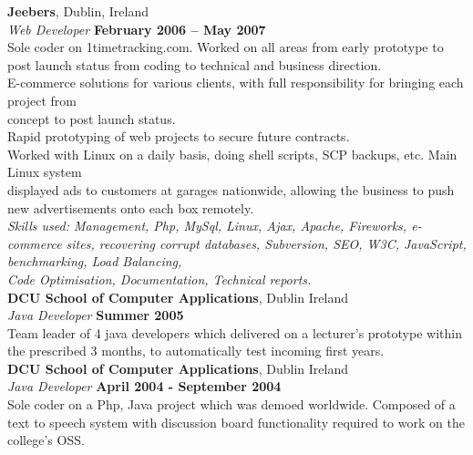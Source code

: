 \documentclass[margin,line]{resume}
\begin{document}
\begin{resume}
    \textbf{Jeebers}, Dublin, Ireland \vspace{2mm}\\\vspace{1mm}%
    \textsl{Web Developer} \hfill \textbf{February 2006 -- May 2007}\\
    Sole coder on 1timetracking.com. Worked on all areas from early prototype to post launch status from coding to technical and business direction. \\%
    E-commerce solutions for various clients, with full responsibility for bringing each project from \\ concept to post launch status. \vspace{1mm}\\%
    Rapid prototyping of web projects to secure future contracts. \vspace{1mm}\\%
    Worked with Linux on a daily basis, doing shell scripts, SCP backups, etc. Main Linux system \\ displayed ads to customers at garages nationwide, allowing the business to push new advertisements onto each box remotely.\vspace{1mm}\\%
    \textsl{Skills used: Management, Php, MySql, Linux, Ajax, Apache, Fireworks, e-commerce sites, recovering corrupt databases, Subversion, SEO, W3C, JavaScript, benchmarking, Load Balancing, \\Code Optimisation, Documentation, Technical reports.}\vspace{1mm}\\%


    \textbf{DCU School of Computer Applications}, Dublin Ireland \vspace{2mm}\\\vspace{1mm}%
    \textsl{Java Developer} \hfill \textbf{Summer 2005}\\
    Team leader of 4 java developers which delivered on a lecturer's prototype within the prescribed 3 months, to automatically test incoming first years. \vspace{1mm}\\%
    \textbf{DCU School of Computer Applications}, Dublin Ireland \vspace{2mm}\\\vspace{1mm}%
    \textsl{Java Developer} \hfill \textbf{April 2004 - September 2004}\\
    Sole coder on a Php, Java project which was demoed worldwide. Composed of a text to speech system with discussion board functionality required to work on the college's OSS.


\end{resume}
\end{document}
